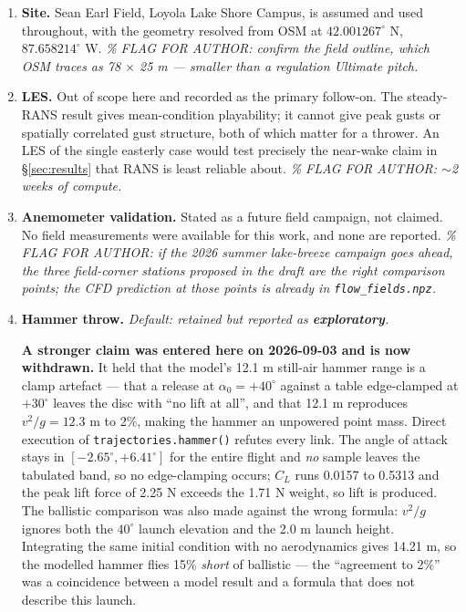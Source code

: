 \documentclass[11pt,letterpaper]{article}
\begin{document}
\begin{enumerate}[leftmargin=*,itemsep=3pt]
  \item \textbf{Site.} Sean Earl Field, Loyola Lake Shore Campus, is assumed
    and used throughout, with the geometry resolved from OSM at
    $42.001267^\circ$ N, $87.658214^\circ$ W. \emph{\% FLAG FOR AUTHOR: confirm
    the field outline, which OSM traces as 78 $\times$ 25 m --- smaller than a
    regulation Ultimate pitch.}

  \item \textbf{LES.} Out of scope here and recorded as the primary follow-on.
    The steady-RANS result gives mean-condition playability; it cannot give
    peak gusts or spatially correlated gust structure, both of which matter for
    a thrower. An LES of the single easterly case would test precisely the
    near-wake claim in \S\ref{sec:results} that RANS is least reliable about.
    \emph{\% FLAG FOR AUTHOR: $\sim$2 weeks of compute.}

  \item \textbf{Anemometer validation.} Stated as a future field campaign, not
    claimed. No field measurements were available for this work, and none are
    reported. \emph{\% FLAG FOR AUTHOR: if the 2026 summer lake-breeze campaign
    goes ahead, the three field-corner stations proposed in the draft are the
    right comparison points; the CFD prediction at those points is already in
    \texttt{flow\_fields.npz}.}

  \item \textbf{Hammer throw.} \emph{Default: retained but reported as
    \textbf{exploratory}.}

    \textbf{A stronger claim was entered here on 2026-09-03 and is now withdrawn.} It
    held that the model's 12.1 m still-air hammer range is a clamp artefact --- that a
    release at $\alpha_0 = +40^\circ$ against a table edge-clamped at $+30^\circ$ leaves
    the disc with ``no lift at all'', and that 12.1 m reproduces $v^2/g = 12.3$ m to
    2\%, making the hammer an unpowered point mass. Direct execution of
    \texttt{trajectories.hammer()} refutes every link. The angle of attack stays in
    $[-2.65^\circ, +6.41^\circ]$ for the entire flight and \emph{no} sample leaves the
    tabulated band, so no edge-clamping occurs; $C_L$ runs 0.0157 to 0.5313 and the peak
    lift force of 2.25 N exceeds the 1.71 N weight, so lift is produced. The ballistic
    comparison was also made against the wrong formula: $v^2/g$ ignores both the
    $40^\circ$ launch elevation and the 2.0 m launch height. Integrating the same initial
    condition with no aerodynamics gives 14.21 m, so the modelled hammer flies 15\%
    \emph{short} of ballistic --- the ``agreement to 2\%'' was a coincidence between a
    model result and a formula that does not describe this launch.


\end{enumerate}
\end{document}
